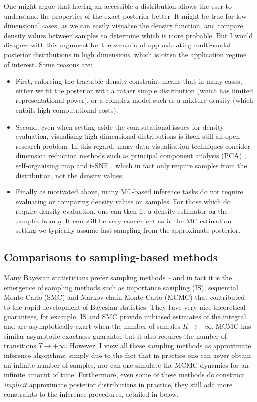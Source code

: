 One might argue that having an accessible $q$ distribution allows the user to understand the properties of the exact posterior better. It might be true for low dimensional cases, as we can easily visualise the density function, and compare density values between samples to determine which is more probable. But I would disagree with this argument for the scenario of approximating multi-modal posterior distributions in high dimensions, which is often the application regime of interest. Some reasons are:
\begin{itemize}
\item First, enforcing the tractable density constraint means that in many cases, either we fit the posterior with a rather simple distribution (which has limited representational power), or a complex model such as a mixture density (which entails high computational costs). 

\item Second, even when setting aside the computational issues for density evaluation, visualising high dimensional distributions is itself still an open research problem. In this regard, many data visualisation techniques consider dimension reduction methods such as principal component analysis (PCA) \citep{pearson:pca1901}, self-organising map \citep{kohonen:som1998, venna:som2003} and t-SNE \citep{maaten:tsne2008}, which in fact only require samples from the distribution, not the density values. 

\item Finally as motivated above, many MC-based inference tasks do not require evaluating or comparing density values on samples. For those which do require density evaluation, one can then fit a density estimator on the samples from $q$. It can still be very convenient as in the MC estimation setting we typically assume fast sampling from the approximate posterior.
\end{itemize}

\subsection{Comparisons to sampling-based methods}
Many Bayesian statisticians prefer sampling methods -- and in fact it is the emergence of sampling methods such as importance sampling (IS), sequential Monte Carlo (SMC) \citep{doucet:smc2001} and Markov chain Monte Carlo (MCMC) that contributed to the rapid development of Bayesian statistics. They have very nice theoretical guarantees, for example, IS and SMC provide unbiased estimates of the integral and are asymptotically exact when the number of samples $K \rightarrow +\infty$. MCMC has similar asymptotic exactness guarantee but it also requires the number of transitions $T \rightarrow +\infty$. However, I view all these sampling methods as approximate inference algorithms, simply due to the fact that in practice one can never obtain an infinite number of samples, nor can one simulate the MCMC dynamics for an infinite amount of time. Furthermore, even some of these methods do construct \emph{implicit} approximate posterior distributions in practice, they still add more constraints to the inference procedures, detailed in below.

